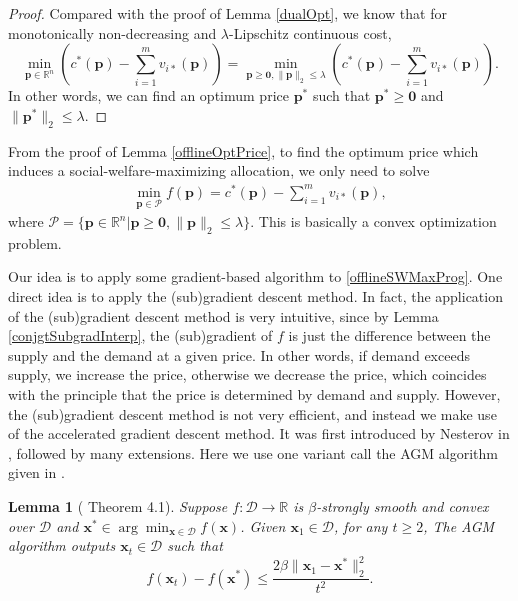 \documentclass{article}
\newtheorem{lemma}{Lemma}[section]
\begin{document}
\begin{proof}
    Compared with the proof of Lemma \ref{dualOpt}, we know that for monotonically non-decreasing and $\lambda$-Lipschitz continuous cost,
    \begin{equation}\label{boundedPrice}
        \min_{\mathbf{p}\in \mathbb{R}^n}\left(c^*(\mathbf{p})-\sum_{i=1}^{m}v_{i*}(\mathbf{p})\right)=\min_{\mathbf{p}\ge \mathbf{0},\|\mathbf{p}\|_2\le\lambda}\left(c^*(\mathbf{p})-\sum_{i=1}^{m}v_{i*}(\mathbf{p})\right).
    \end{equation}
    In other words, we can find an optimum price $\mathbf{p}^*$ such that $\mathbf{p}^*\ge \mathbf{0}$ and $\|\mathbf{p}^*\|_2\le\lambda$.
\end{proof}

From the proof of Lemma \ref{offlineOptPrice}, to find the optimum price which induces a social-welfare-maximizing allocation, we only need to solve
\begin{equation}\label{offlineSWMaxProg}
    \begin{array}{rl}
        \min_{\mathbf{p}\in \mathcal{P}}f(\mathbf{p})=c^*(\mathbf{p})-\sum_{i=1}^{m}v_{i*}(\mathbf{p}),
    \end{array}
\end{equation}
where $\mathcal{P}=\{\mathbf{p}\in \mathbb{R}^n|\mathbf{p}\ge \mathbf{0},\|\mathbf{p}\|_2\le\lambda\}$. This is basically a convex optimization problem.

Our idea is to apply some gradient-based algorithm to \eqref{offlineSWMaxProg}. One direct idea is to apply the (sub)gradient descent method. In fact, the application of the (sub)gradient descent method is very intuitive, since by Lemma \ref{conjgtSubgradInterp}, the (sub)gradient of $f$ is just the difference between the supply and the demand at a given price. In other words, if demand exceeds supply, we increase the price, otherwise we decrease the price, which coincides with the principle that the price is determined by demand and supply. However, the (sub)gradient descent method is not very efficient, and instead we make use of the accelerated gradient descent method. It was first introduced by Nesterov in \cite{N83}, followed by many extensions. Here we use one variant call the AGM algorithm given in \cite{AO14}.
\begin{lemma}[\cite{AO14} Theorem 4.1]\label{AGM}
    Suppose $f:\mathcal{D}\to \mathbb{R}$ is $\beta$-strongly smooth and convex over $\mathcal{D}$ and $\mathbf{x}^*\in\arg\min_{\mathbf{x}\in \mathcal{D}}f(\mathbf{x})$. Given $\mathbf{x}_1\in \mathcal{D}$, for any $t\ge2$, The AGM algorithm outputs $\mathbf{x}_t\in \mathcal{D}$ such that
    \begin{equation}
        f(\mathbf{x}_t)-f(\mathbf{x}^*)\le \frac{2\beta\|\mathbf{x}_1-\mathbf{x}^*\|_2^2}{t^2}.
    \end{equation}
\end{lemma}
\end{document}
